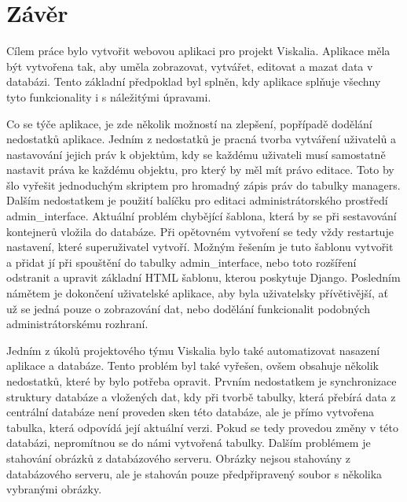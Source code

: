 \chapter{Závěr}
\label{5-zaver}


Cílem práce bylo vytvořit webovou aplikaci pro projekt
Viskalia. Aplikace měla být vytvořena tak, aby uměla zobrazovat,
vytvářet, editovat a mazat data v databázi. Tento základní předpoklad
byl splněn, kdy aplikace splňuje všechny tyto funkcio\-nality i s
náležitými úpravami.

Co se týče aplikace, je zde několik možností na zlepšení, popřípadě
dodělání nedostatků aplikace. Jedním z nedostatků je pracná tvorba
vytváření uživatelů a nastavování jejich práv k objektům, kdy se
každému uživateli musí samostatně nastavit práva ke každému objektu,
pro který by měl mít právo editace. Toto by šlo vyřešit jednoduchým
skriptem pro hromadný zápis práv do tabulky managers. Dalším
nedostatkem je použití balíčku pro editaci administrátorského
prostředí admin\_interface. Aktuální problém chybějící šablona, která
by se při sestavování kontejnerů vložila do databáze. Při opětovném
vytvoření se tedy vždy restartuje nastavení, které superuživatel
vytvoří. Možným řešením je tuto šablonu vytvořit a přidat jí při
spouštění do tabulky admin\_interface, nebo toto rozšíření odstranit a
upravit základní HTML šablonu, kterou poskytuje Django. Posledním
námětem je dokončení uživatelské aplikace, aby byla uživatelsky
přívětivější, ať už se jedná pouze o zobrazování dat, nebo dodělání
funkcionalit podobných administrátorskému rozhraní.

Jedním z úkolů projektového týmu Viskalia bylo také automatizovat
nasazení aplikace a databáze. Tento problém byl také vyřešen, ovšem
obsahuje několik nedostatků, které by bylo potřeba opravit. Prvním
nedostatkem je synchronizace struktury databáze a vložených dat, kdy
při tvorbě tabulky, která přebírá data z centrální databáze není
proveden sken této databáze, ale je přímo vytvořena tabulka, která
odpovídá její aktuální verzi. Pokud se tedy provedou změny v této
databázi, nepromítnou se do námi vytvořená tabulky. Dalším problémem
je stahování obrázků z databázového serveru. Obrázky nejsou stahovány
z databázového serveru, ale je stahován pouze předpřipravený soubor s
několika vybranými obrázky.
